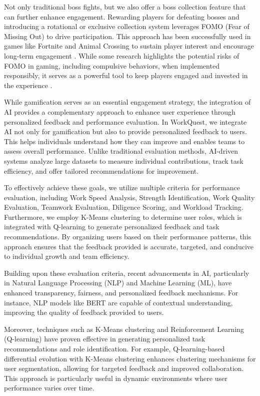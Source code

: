     Not only traditional boss fights, but we also offer a boss collection feature that can further enhance engagement. Rewarding players for defeating bosses and introducing a rotational or exclusive collection system leverages FOMO (Fear of Missing Out) to drive participation. This approach has been successfully used in games like Fortnite and Animal Crossing to sustain player interest and encourage long-term engagement \cite{medium:FOMO}. While some research highlights the potential risks of FOMO in gaming, including compulsive behaviors, when implemented responsibly, it serves as a powerful tool to keep players engaged and invested in the experience \cite{FOMO:1} \cite{FOMO:2}.

    While gamification serves as an essential engagement strategy, the integration of AI provides a complementary approach to enhance user experience through personalized feedback and performance evaluation. In WorkQuest, we integrate AI not only for gamification but also to provide personalized feedback to users. This helps individuals understand how they can improve and enables teams to assess overall performance. Unlike traditional evaluation methods, AI-driven systems analyze large datasets to measure individual contributions, track task efficiency, and offer tailored recommendations for improvement.

    To effectively achieve these goals, we utilize multiple criteria for performance evaluation, including Work Speed Analysis, Strength Identification, Work Quality Evaluation, Teamwork Evaluation, Diligence Scoring, and Workload Tracking. Furthermore, we employ K-Means clustering to determine user roles, which is integrated with Q-learning to generate personalized feedback and task recommendations. By organizing users based on their performance patterns, this approach ensures that the feedback provided is accurate, targeted, and conducive to individual growth and team efficiency.

    Building upon these evaluation criteria, recent advancements in AI, particularly in Natural Language Processing (NLP) and Machine Learning (ML), have enhanced transparency, fairness, and personalized feedback mechanisms. For instance, NLP models like BERT are capable of contextual understanding, improving the quality of feedback provided to users. \cite{AI:humanResource}

    Moreover, techniques such as K-Means clustering and Reinforcement Learning (Q-learning) have proven effective in generating personalized task recommendations and role identification. For example, Q-learning-based differential evolution with K-Means clustering enhances clustering mechanisms for user segmentation, allowing for targeted feedback and improved collaboration. This approach is particularly useful in dynamic environments where user performance varies over time. \cite{PlusOne:Q-learingWithK-means}

